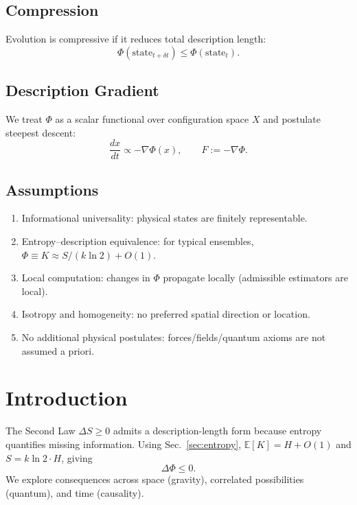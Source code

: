 \documentclass[aps,preprint,onecolumn,longbibliography,nofootinbib]{revtex4-2}
\numberwithin{equation}{section}
\begin{document}
\subsection{Compression}
Evolution is compressive if it reduces total description length:
\begin{equation}
\Phi(\text{state}_{t+\delta t}) \le \Phi(\text{state}_t).\label{eq:compressive}
\end{equation}

\subsection{Description Gradient}
We treat $\Phi$ as a scalar functional over configuration space $X$ and postulate steepest descent:
\begin{equation}
\frac{dx}{dt} \propto -\nabla\Phi(x),\qquad F:=-\nabla\Phi.\label{eq:desc}
\end{equation}

\subsection*{Assumptions}
\begin{enumerate}
\item Informational universality: physical states are finitely representable.
\item Entropy--description equivalence: for typical ensembles, $\Phi\equiv K\approx S/(k\ln2)+O(1)$.
\item Local computation: changes in $\Phi$ propagate locally (admissible estimators are local).
\item Isotropy and homogeneity: no preferred spatial direction or location.
\item No additional physical postulates: forces/fields/quantum axioms are not assumed a priori.
\end{enumerate}

\section{Introduction}
The Second Law $\Delta S\ge0$ admits a description-length form because entropy quantifies missing information. Using Sec.~\ref{sec:entropy}, $\mathbb{E}[K]=H+O(1)$ and $S=k\ln2\cdot H$, giving
\begin{equation}
\Delta\Phi\le0.\label{eq:secondLaw}
\end{equation}
We explore consequences across space (gravity), correlated possibilities (quantum), and time (causality).
\end{document}
